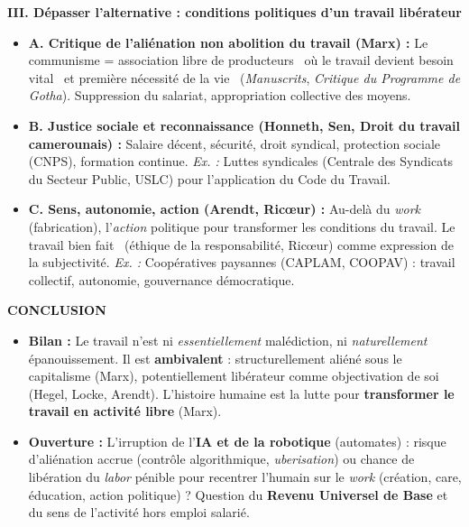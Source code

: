 \documentclass[11pt]{article}
\begin{document}
\begin{corrige}
\textbf{III. Dépasser l'alternative : conditions politiques d'un travail libérateur}
\begin{itemize}
\item \textbf{A. Critique de l'aliénation non abolition du travail (Marx) :} Le communisme = \guillemotleft association libre de producteurs \guillemotright\ où le travail devient \guillemotleft besoin vital \guillemotright\ et \guillemotleft première nécessité de la vie \guillemotright\ (\emph{Manuscrits}, \emph{Critique du Programme de Gotha}). Suppression du salariat, appropriation collective des moyens.
\item \textbf{B. Justice sociale et reconnaissance (Honneth, Sen, Droit du travail camerounais) :} Salaire décent, sécurité, droit syndical, protection sociale (CNPS), formation continue. \emph{Ex. :} Luttes syndicales (Centrale des Syndicats du Secteur Public, USLC) pour l'application du Code du Travail.
\item \textbf{C. Sens, autonomie, action (Arendt, Ricœur) :} Au-delà du \emph{work} (fabrication), l'\emph{action} politique pour transformer les conditions du travail. Le \guillemotleft travail bien fait \guillemotright\ (éthique de la responsabilité, Ricœur) comme expression de la subjectivité. \emph{Ex. :} Coopératives paysannes (CAPLAM, COOPAV) : travail collectif, autonomie, gouvernance démocratique.
\end{itemize}

\textbf{CONCLUSION}
\begin{itemize}
\item \textbf{Bilan :} Le travail n'est ni \emph{essentiellement} malédiction, ni \emph{naturellement} épanouissement. Il est \textbf{ambivalent} : structurellement aliéné sous le capitalisme (Marx), potentiellement libérateur comme objectivation de soi (Hegel, Locke, Arendt). L'histoire humaine est la lutte pour \textbf{transformer le travail en activité libre} (Marx).
\item \textbf{Ouverture :} L'irruption de l'\textbf{IA et de la robotique} (automates) : risque d'aliénation accrue (contrôle algorithmique, \emph{uberisation}) ou chance de libération du \emph{labor} pénible pour recentrer l'humain sur le \emph{work} (création, care, éducation, action politique) ? Question du \textbf{Revenu Universel de Base} et du sens de l'activité hors emploi salarié.
\end{itemize}
\end{corrige}
\end{document}
